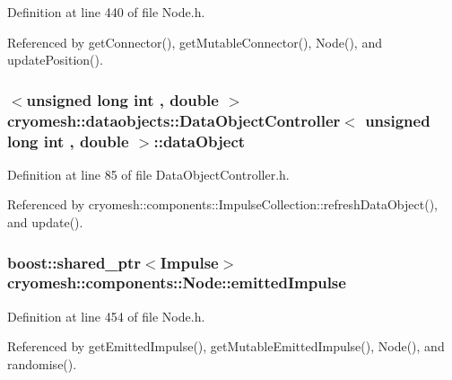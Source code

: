 \-Definition at line 440 of file \-Node.\-h.



\-Referenced by get\-Connector(), get\-Mutable\-Connector(), \-Node(), and update\-Position().

\hypertarget{classcryomesh_1_1dataobjects_1_1DataObjectController_aa13d30e9fa2f1caa0510635214d4bb26}{
\subsubsection[{data\-Object}]{$<$unsigned long int , double $>$ {\bf cryomesh\-::dataobjects\-::\-Data\-Object\-Controller}$<$ unsigned long int , double  $>$\-::{\bf data\-Object}}}\label{classcryomesh_1_1dataobjects_1_1DataObjectController_aa13d30e9fa2f1caa0510635214d4bb26}


\-Definition at line 85 of file \-Data\-Object\-Controller.\-h.



\-Referenced by cryomesh\-::components\-::\-Impulse\-Collection\-::refresh\-Data\-Object(), and update().

\hypertarget{classcryomesh_1_1components_1_1Node_a6b5e004fc2bbdbd8ec7173b44af8ffe5}{
\subsubsection[{emitted\-Impulse}]{\setlength{\rightskip}{0pt plus 5cm}boost\-::shared\-\_\-ptr$<${\bf \-Impulse}$>$ {\bf cryomesh\-::components\-::\-Node\-::emitted\-Impulse}}}\label{classcryomesh_1_1components_1_1Node_a6b5e004fc2bbdbd8ec7173b44af8ffe5}


\-Definition at line 454 of file \-Node.\-h.



\-Referenced by get\-Emitted\-Impulse(), get\-Mutable\-Emitted\-Impulse(), \-Node(), and randomise().

